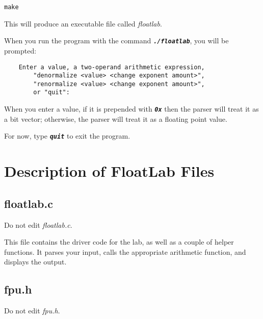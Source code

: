     \texttt{make}

    This will produce an executable file called \textit{floatlab}.

    When you run the program with the command \texttt{\textbf{\textit{./floatlab}}}, you will be prompted:

    \begin{verbatim}
    Enter a value, a two-operand arithmetic expression,
        "denormalize <value> <change exponent amount>",
        "renormalize <value> <change exponent amount>",
        or "quit":
    \end{verbatim}

    When you enter a value, if it is prepended with \texttt{\textbf{\textit{0x}}} then the parser will treat it as a bit vector;
    otherwise, the parser will treat it as a floating point value.

    For now, type \texttt{\textbf{\textit{quit}}} to exit the program.


    \section{Description of FloatLab Files}

    \subsection{floatlab.c}

    Do not edit \textit{floatlab.c}.

    This file contains the driver code for the lab, as well as a couple of helper functions.
    It parses your input, calls the appropriate arithmetic function, and displays the output.

    \subsection{fpu.h}\label{subsec:fpu.h}

    Do not edit \textit{fpu.h}.

